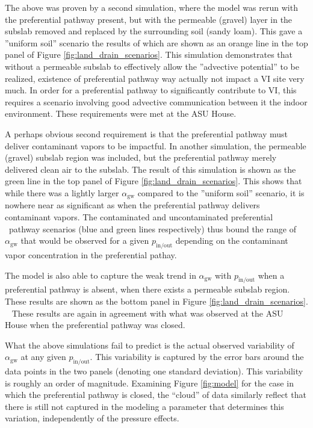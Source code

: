\documentclass[journal=esthag,manuscript=article]{achemso}
\begin{document}
The above was proven by a second simulation, where the model was rerun with the preferential pathway present, but with the permeable (gravel) layer in the subslab removed and replaced by the surrounding soil (sandy loam).
This gave a ”uniform soil” scenario the results of which are shown as an orange line in the top panel of Figure \ref{fig:land_drain_scenarios}.
This simulation demonstrates that without a permeable subslab to effectively allow the ”advective potential” to be realized, existence of preferential pathway way actually not impact a VI site very much.
In order for a preferential pathway to significantly contribute to VI, this requires a scenario involving good advective communication between it the indoor environment.
These requirements were met at the ASU House.

A perhaps obvious second requirement is that the preferential pathway must deliver contaminant vapors to be impactful.
In another simulation, the permeable (gravel) subslab region was included, but the preferential pathway merely delivered clean air to the subslab.
The result of this simulation is shown as the green line in the top panel of Figure \ref{fig:land_drain_scenarios}.
This shows that while there was a lightly larger $\alpha_\mathrm{gw}$ compared to the ”uniform soil” scenario, it is nowhere near as significant as when the preferential pathway delivers contaminant vapors.
The contaminated and uncontaminated preferential  pathway scenarios (blue and green lines respectively) thus bound the range of $\alpha_\mathrm{gw}$ that would be observed for a given $p_\mathrm{in/out}$ depending on the contaminant vapor concentration in the preferential pathay.

The model is also able to capture the weak trend in $\alpha_\mathrm{gw}$ with $p_\mathrm{in/out}$ when a preferential pathway is absent, when there exists a permeable subslab region. These results are shown as the bottom panel in Figure \ref{fig:land_drain_scenarios}.  
These results are again in agreement with what was observed at the ASU House when the preferential pathway was closed.

What the above simulations fail to predict is the actual observed variability of $\alpha_\mathrm{gw}$ at any given $p_\mathrm{in/out}$.
This variability is captured by the error bars around the data points in the two panels (denoting one standard deviation).
This variability is roughly an order of magnitude.
Examining Figure \ref{fig:model} for the case in which the preferential pathway is closed, the “cloud” of data similarly reflect that there is still not captured in the modeling a parameter that determines this variation, independently of the pressure effects.
\end{document}
